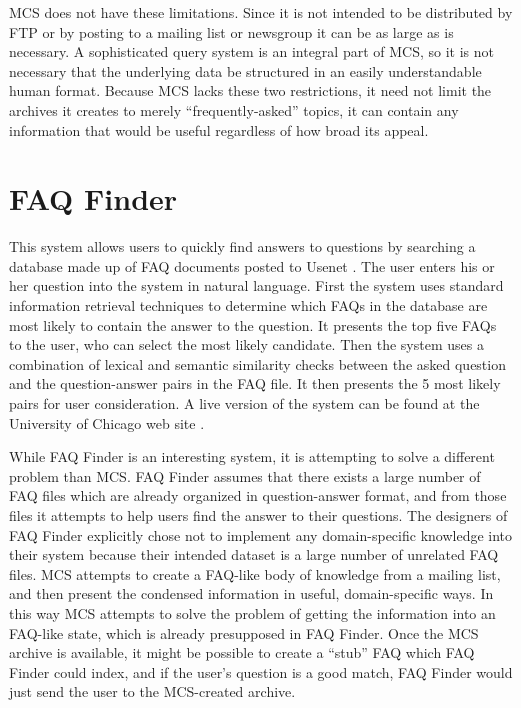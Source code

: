 MCS does not have these limitations. Since it is not intended to be distributed
by FTP or by posting to a mailing list or newsgroup it can be as large as is
necessary. A sophisticated query system is an integral part of MCS, so it is
not necessary that the underlying data be structured in an easily
understandable human format. Because MCS lacks these two restrictions, it need
not limit the archives it creates to merely ``frequently-asked'' topics, it can
contain any information that would be useful regardless of how broad its
appeal.

\section{FAQ {\sc Finder}}
This system allows users to quickly find answers to questions by searching a
database made up of FAQ documents posted to Usenet \cite{Burke97}. The user
enters his or her question into the system in natural language. First the
system uses standard information retrieval techniques to determine which FAQs
in the database are most likely to contain the answer to the question. It
presents the top five FAQs to the user, who can select the most likely
candidate.  Then the system uses a combination of lexical and semantic
similarity checks between the asked question and the question-answer pairs in
the FAQ file. It then presents the 5 most likely pairs for user consideration.
A live version of the system can be found at the University of Chicago web site
\cite{faq-finder-website}.

While FAQ {\sc Finder} is an interesting system, it is attempting to solve a
different problem than MCS. FAQ {\sc Finder} assumes that there exists a large
number of FAQ files which are already organized in question-answer format, and
from those files it attempts to help users find the answer to their questions.
The designers of FAQ {\sc Finder} explicitly chose not to implement any
domain-specific knowledge into their system because their intended dataset is a
large number of unrelated FAQ files. MCS attempts to create a FAQ-like body of
knowledge from a mailing list, and then present the condensed information in
useful, domain-specific ways. In this way MCS attempts to solve the problem of
getting the information into an FAQ-like state, which is already presupposed in
FAQ {\sc Finder}. Once the MCS archive is available, it might be possible to
create a ``stub'' FAQ which FAQ {\sc Finder} could index, and if the user's
question is a good match, FAQ {\sc Finder} would just send the user to the
MCS-created archive.

